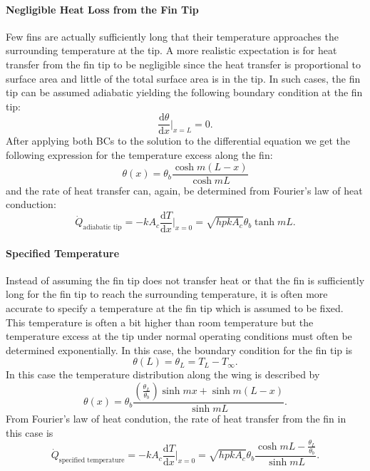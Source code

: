\paragraph{Negligible Heat Loss from the Fin Tip}
Few fins are actually sufficiently long that their temperature approaches the surrounding temperature at the tip.
A more realistic expectation is for heat transfer from the fin tip to be negligible since the heat transfer is proportional to surface area and little of the total surface area is in the tip.
In such cases, the fin tip can be assumed adiabatic yielding the following boundary condition at the fin tip:
\begin{equation*}
  \frac{\mathrm{d}\theta}{\mathrm{d}x} \bigg|_{x = L} = 0
.\end{equation*}
After applying both BCs to the solution to the differential equation we get the following expression for the temperature excess along the fin:
\begin{equation*}
  \theta(x) = \theta_b \frac{\cosh m (L-x)}{\cosh m L}
\end{equation*}
and the rate of heat transfer can, again, be determined from Fourier's law of heat conduction:
\begin{equation*}
  \dot{Q}_{\text{adiabatic tip}} = - k A_c \frac{\mathrm{d}T}{\mathrm{d}x} \bigg|_{x = 0} = \sqrt{h p k A_c} \theta_b \tanh m L
.\end{equation*}

\paragraph{Specified Temperature}
Instead of assuming the fin tip does not transfer heat or that the fin is sufficiently long for the fin tip to reach the surrounding temperature, it is often more accurate to specify a temperature at the fin tip which is assumed to be fixed.
This temperature is often a bit higher than room temperature but the temperature excess at the tip under normal operating conditions must often be determined exponentially.
In this case, the boundary condition for the fin tip is
\begin{equation*}
  \theta(L) = \theta_L = T_L - T_{\infty}
.\end{equation*}
In this case the temperature distribution along the wing is described by
\begin{equation*}
  \theta(x) = \theta_b \frac{\left( \frac{\theta_L}{\theta_b} \right) \sinh m x + \sinh m (L-x)}{\sinh m L}
.\end{equation*}
From Fourier's law of heat condution, the rate of heat transfer from the fin in this case is
\begin{equation*}
  \dot{Q}_{\text{specified temperature}} = - k A_{c} \frac{\mathrm{d}T}{\mathrm{d}x} \bigg|_{x = 0} = \sqrt{h p k A_c} \theta_b \frac{\cosh m L - \frac{\theta_L}{\theta_b}}{\sinh m L}
.\end{equation*}

